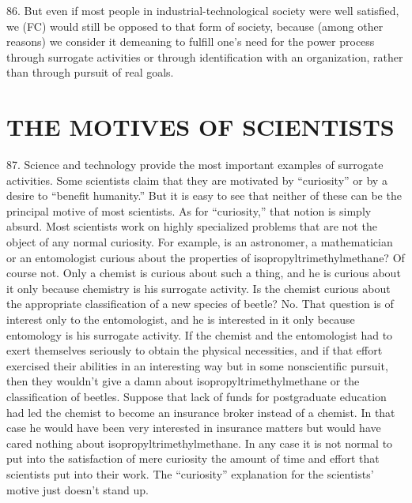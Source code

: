 \documentclass{article}
\begin{document}
86. But even if most people in industrial-technological society were well satisfied, we (FC) would 
still be opposed to that form of society, because (among other reasons) we consider it demeaning 
to fulfill one’s need for the power process through surrogate activities or through identification 
with an organization, rather than through pursuit of real goals. 


\section{THE MOTIVES OF SCIENTISTS}

\hspace{0.5cm} 87. Science and technology provide the most important examples of surrogate activities. Some 
scientists claim that they are motivated by “curiosity” or by a desire to “benefit humanity.” But it 
is easy to see that neither of these can be the principal motive of most scientists. As for “curiosity,” 
that notion is simply absurd. Most scientists work on highly specialized problems that are not the 
object of any normal curiosity. For example, is an astronomer, a mathematician or an entomologist 
curious about the properties of isopropyltrimethylmethane? Of course not. Only a chemist is 
curious about such a thing, and he is curious about it only because chemistry is his surrogate 
activity. Is the chemist curious about the appropriate classification of a new species of beetle? 
No. That question is of interest only to the entomologist, and he is interested in it only because 
entomology is his surrogate activity. If the chemist and the entomologist had to exert themselves 
seriously to obtain the physical necessities, and if that effort exercised their abilities in an 
interesting way but in some nonscientific pursuit, then they wouldn’t give a damn about 
isopropyltrimethylmethane or the classification of beetles. Suppose that lack of funds for 
postgraduate education had led the chemist to become an insurance broker instead of a chemist. In 
that case he would have been very interested in insurance matters but would have cared nothing 
about isopropyltrimethylmethane. In any case it is not normal to put into the satisfaction of mere 
curiosity the amount of time and effort that scientists put into their work. The “curiosity” 
explanation for the scientists’ motive just doesn’t stand up. \vspace{\baselineskip}
\end{document}
